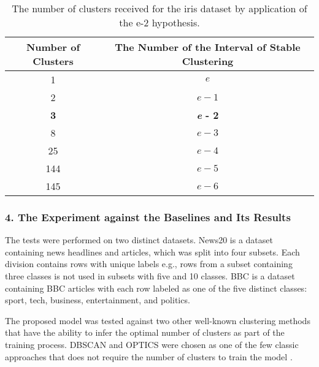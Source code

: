\begin{table}[ht]%
	\centering
	\caption{The number of clusters received for the iris dataset by application of the e-2 hypothesis.}%
	\label{tab:irisE2}%
		\begin{tabular}{ c  c }%
			\toprule
			Number of Clusters & The Number of the Interval of Stable Clustering\\
			\hline
			1 & \(e\) \\
			2 & \(e - 1\) \\
			\textbf{3} & \textbf{\textit{e} - 2} \\
			8 & \(e - 3\) \\
			25 & \(e - 4\) \\
			144 & \(e - 5\) \\			
			145 & \(e - 6\) \\			
			\bottomrule
		\end{tabular}%
\end{table}

\subsubsection{4. The Experiment against the Baselines and Its Results}

The tests were performed on two distinct datasets. News20 is a dataset containing news headlines and articles, which was split into four subsets. Each division contains rows with unique labels e.g., rows from a subset containing three classes is not used in subsets with five and 10 classes. BBC is a dataset containing BBC articles with each row labeled as one of the five distinct classes: sport, tech, business, entertainment, and politics.

The proposed model was tested against two other well-known clustering methods that have the ability to infer the optimal number of clusters as part of the training process. DBSCAN and OPTICS were chosen as one of the few classic approaches that does not require the number of clusters to train the model \cite{EsterKriegelSander,SchubertGertz}.

